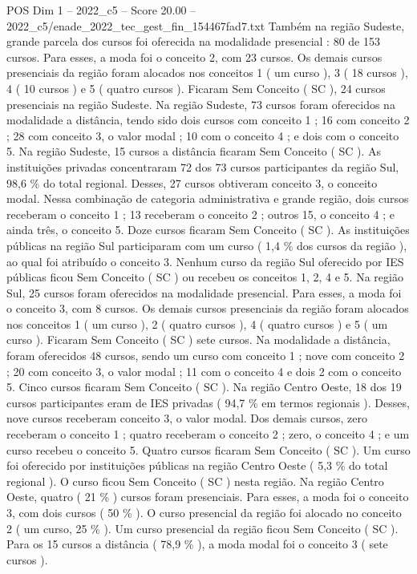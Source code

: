 \begin{textsample}{POS Dim 1 – 2022\_c5 – Score 20.00 – 2022\_c5/enade\_2022\_tec\_gest\_fin\_154467fad7.txt}
Também na região Sudeste, grande parcela dos cursos foi oferecida na modalidade presencial : 80 de 153 cursos.
Para esses, a moda foi o conceito 2, com 23 cursos.
Os demais cursos presenciais da região foram alocados nos conceitos 1 ( um curso ), 3 ( 18 cursos ), 4 ( 10 cursos ) e 5 ( quatro cursos ).
Ficaram Sem Conceito ( SC ), 24 cursos presenciais na região Sudeste.
Na região Sudeste, 73 cursos foram oferecidos na modalidade a distância, tendo sido dois cursos com conceito 1 ; 16 com conceito 2 ; 28 com conceito 3, o valor modal ; 10 com o conceito 4 ; e dois com o conceito 5.
Na região Sudeste, 15 cursos a distância ficaram Sem Conceito ( SC ).
As instituições privadas concentraram 72 dos 73 cursos participantes da região Sul, 98,6 \% do total regional.
Desses, 27 cursos obtiveram conceito 3, o conceito modal.
Nessa combinação de categoria administrativa e grande região, dois cursos receberam o conceito 1 ; 13 receberam o conceito 2 ; outros 15, o conceito 4 ; e ainda três, o conceito 5.
Doze cursos ficaram Sem Conceito ( SC ).
As instituições públicas na região Sul participaram com um curso ( 1,4 \% dos cursos da região ), ao qual foi atribuído o conceito 3.
Nenhum curso da região Sul oferecido por IES públicas ficou Sem Conceito ( SC ) ou recebeu os conceitos 1, 2, 4 e 5.
Na região Sul, 25 cursos foram oferecidos na modalidade presencial.
Para esses, a moda foi o conceito 3, com 8 cursos.
Os demais cursos presenciais da região foram alocados nos conceitos 1 ( um curso ), 2 ( quatro cursos ), 4 ( quatro cursos ) e 5 ( um curso ).
Ficaram Sem Conceito ( SC ) sete cursos.
Na modalidade a distância, foram oferecidos 48 cursos, sendo um curso com conceito 1 ; nove com conceito 2 ; 20 com conceito 3, o valor modal ; 11 com o conceito 4 e dois 2 com o conceito 5.
Cinco cursos ficaram Sem Conceito ( SC ).
Na região Centro Oeste, 18 dos 19 cursos participantes eram de IES privadas ( 94,7 \% em termos regionais ).
Desses, nove cursos receberam conceito 3, o valor modal.
Dos demais cursos, zero receberam o conceito 1 ; quatro receberam o conceito 2 ; zero, o conceito 4 ; e um curso recebeu o conceito 5.
Quatro cursos ficaram Sem Conceito ( SC ).
Um curso foi oferecido por instituições públicas na região Centro Oeste ( 5,3 \% do total regional ).
O curso ficou Sem Conceito ( SC ) nesta região.
Na região Centro Oeste, quatro ( 21 \% ) cursos foram presenciais.
Para esses, a moda foi o conceito 3, com dois cursos ( 50 \% ).
O curso presencial da região foi alocado no conceito 2 ( um curso, 25 \% ).
Um curso presencial da região ficou Sem Conceito ( SC ).
Para os 15 cursos a distância ( 78,9 \% ), a moda modal foi o conceito 3 ( sete cursos ).

\end{textsample}
